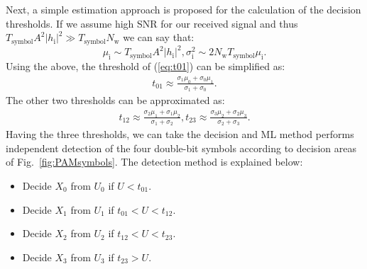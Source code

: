 \documentclass[journal]{IEEEtran}
\begin{document}
%
Next, a simple estimation approach is  proposed for the calculation of the decision thresholds.
If we assume  high SNR for our received signal and thus 
$T_\text{symbol}A^2 |h_\text{i}|^2 \gg T_\text{symbol}N_\text{w}$  we can say that:
\begin{equation}
\mu_\text{i} \sim T_\text{symbol}A^2 |h_\text{i}|^2, 
 \sigma_\text{i}^2 \sim  2 N_\text{w}T_\text{symbol} \mu_\text{i}.
\label{eq:v}
\end{equation}
%
Using the above, the threshold  of  (\ref{eq:t01})  can be simplified  as: 
%
\begin{equation}
\begin{gathered}
t_\text{01} \approx \frac{\sigma_\text{1} \mu_\text{0}+\sigma_\text{0} \mu_\text{1}} {\sigma_\text{1} + \sigma_\text{0}}.
\end{gathered}
\label{eq:thres01}
\end{equation}
%
The other two  thresholds can be approximated as:
\begin{equation}
\begin{gathered}
t_\text{12} \approx \frac{\sigma_\text{2} \mu_\text{1}+\sigma_\text{1} \mu_\text{2}} {\sigma_\text{1} + \sigma_\text{2}},  t_\text{23} \approx \frac{\sigma_\text{3} \mu_\text{2}+\sigma_\text{2} \mu_\text{3}} {\sigma_\text{2} + \sigma_\text{3}}. 
\end{gathered}
\label{eq:thres123}
\end{equation}
%
Having the three  thresholds, we can take the decision and ML method performs independent detection of the four double-bit symbols  according to decision areas of Fig.~\ref{fig:PAMsymbols}. 
%
The detection method is explained below:

\begin{itemize}
     \item Decide $X_\text{0}$  from $U_\text{0}$ if $ U < t_\text{01}$.
  \item Decide $X_\text{1}$  from $U_\text{1}$ if $t_\text{01} <U< t_\text{12}$.
   \item Decide $X_\text{2}$  from $U_\text{2}$ if $t_\text{12} <U< t_\text{23}$.
     \item Decide $X_\text{3}$  from $U_\text{3}$ if $t_\text{23} >U$.
\end{itemize}
\end{document}
